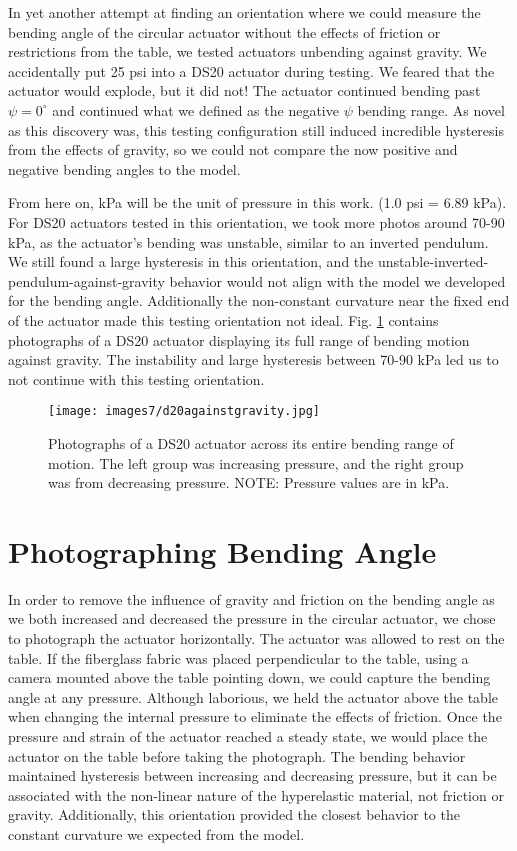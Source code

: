 In yet another attempt at finding an orientation where we could measure the bending angle of the circular actuator without the effects of friction or restrictions from the table, we tested actuators unbending against gravity. We accidentally put 25 psi into a DS20 actuator during testing. We feared that the actuator would explode, but it did not! The actuator continued bending past $\psi=0^\circ$ and continued what we defined as the negative $\psi$ bending range. As novel as this discovery was, this testing configuration still induced incredible hysteresis from the effects of gravity, so we could not compare the now positive and negative bending angles to the model. 

From here on, kPa will be the unit of pressure in this work. (1.0 psi = 6.89 kPa). For DS20 actuators tested in this orientation, we took more photos around 70-90 kPa, as the actuator's bending was unstable, similar to an inverted pendulum. We still found a large hysteresis in this orientation, and the unstable-inverted-pendulum-against-gravity behavior would not align with the model we developed for the bending angle. Additionally the non-constant curvature near the fixed end of the actuator made this testing orientation not ideal. Fig. \ref{fig:d20againstgravity} contains photographs of a DS20 actuator displaying its full range of bending motion against gravity. The instability and large hysteresis between 70-90 kPa led us to not continue with this testing orientation. 

\begin{figure}[h]
    \centering
     \texttt{[image: images7/d20againstgravity.jpg]}
    \caption{Photographs of a DS20 actuator across its entire bending range of motion. The left group was increasing pressure, and the right group was from decreasing pressure. NOTE: Pressure values are in kPa.}
    \label{fig:d20againstgravity}
\end{figure}

\clearpage
\section{Photographing Bending Angle}

In order to remove the influence of gravity and friction on the bending angle as we both increased and decreased the pressure in the circular actuator, we chose to photograph the actuator horizontally. The actuator was allowed to rest on the table. If the fiberglass fabric was placed perpendicular to the table, using a camera mounted above the table pointing down, we could capture the bending angle at any pressure. Although laborious, we held the actuator above the table when changing the internal pressure to eliminate the effects of friction. Once the pressure and strain of the actuator reached a steady state, we would place the actuator on the table before taking the photograph. The bending behavior maintained hysteresis between increasing and decreasing pressure, but it can be associated with the non-linear nature of the hyperelastic material, not friction or gravity. Additionally, this orientation provided the closest behavior to the constant curvature we expected from the model. 

